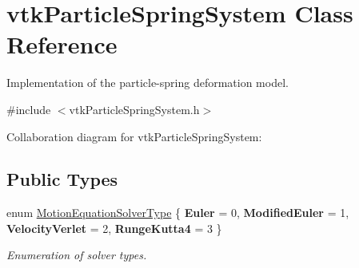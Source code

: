 \hypertarget{classvtkParticleSpringSystem}{
\section{vtkParticleSpringSystem Class Reference}
\label{classvtkParticleSpringSystem}
}


Implementation of the particle-\/spring deformation model.  




{\ttfamily \#include $<$vtkParticleSpringSystem.h$>$}



Collaboration diagram for vtkParticleSpringSystem:\subsection*{Public Types}
\begin{DoxyCompactItemize}
\item 
enum \hyperlink{classvtkParticleSpringSystem_abbafd0d91c7eb36d96000bc5004709cf}{MotionEquationSolverType} \{ {\bfseries Euler} =  0, 
{\bfseries ModifiedEuler} =  1, 
{\bfseries VelocityVerlet} =  2, 
{\bfseries RungeKutta4} =  3
 \}
\begin{DoxyCompactList}\small\item\em Enumeration of solver types. \item\end{DoxyCompactList}\end{DoxyCompactItemize}
